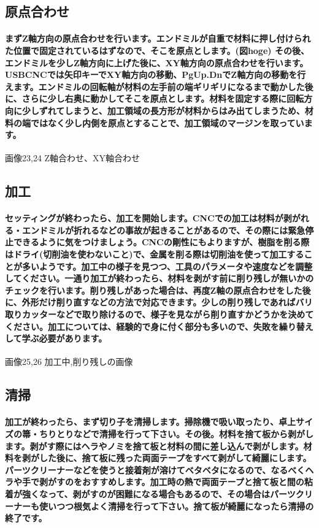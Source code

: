 \documentclass[b5paper, 9pt, twocolumn, titlepage,openany]{jsbook}%
\begin{document}
\subsection{原点合わせ}
\paragraph{まずZ軸方向の原点合わせを行います。エンドミルが自重で材料に押し付けられた位置で固定されているはずなので、そこを原点とします。(図hoge) その後、エンドミルを少しZ軸方向に上げた後に、XY軸方向の原点合わせを行います。USBCNCでは矢印キーでXY軸方向の移動、PgUp.DnでZ軸方向の移動を行えます。エンドミルの回転軸が材料の左手前の端ギリギリになるまで動かした後に、さらに少し右奥に動かしてそこを原点とします。材料を固定する際に回転方向に少しずれてしまうと、加工領域の長方形が材料からはみ出てしまうため、材料の端ではなく少し内側を原点とすることで、加工領域のマージンを取っています。}

画像23,24 Z軸合わせ、XY軸合わせ

\subsection{加工}
\paragraph{セッティングが終わったら、加工を開始します。CNCでの加工は材料が剥がれる・エンドミルが折れるなどの事故が起きることがあるので、その際には緊急停止できるように気をつけましょう。CNCの剛性にもよりますが、樹脂を削る際はドライ(切削油を使わないこと)で、金属を削る際は切削油を使って加工することが多いようです。加工中の様子を見つつ、工具のパラメータや速度などを調整してください。一通り加工が終わったら、材料を剥がす前に削り残しが無いかのチェックを行います。削り残しがあった場合は、再度Z軸の原点合わせをした後に、外形だけ削り直すなどの方法で対応できます。少しの削り残しであればバリ取りカッターなどで取り除けるので、様子を見ながら削り直すかどうかを決めてください。加工については、経験的で身に付く部分も多いので、失敗を繰り替えして学ぶ必要があります。}

画像25,26 加工中,削り残しの画像

\subsection{清掃}
\paragraph{加工が終わったら、まず切り子を清掃します。掃除機で吸い取ったり、卓上サイズの箒・ちりとりなどで清掃を行って下さい。その後。材料を捨て板から剥がします。剥がす際にはヘラやノミを捨て板と材料の間に差し込んで剥がします。材料を剥がした後に、捨て板に残った両面テープをすべて剥がして綺麗にします。パーツクリーナーなどを使うと接着剤が溶けてベタベタになるので、なるべくヘラや手で剥がすのをおすすめします。加工時の熱で両面テープと捨て板と間の粘着が強くなって、剥がすのが困難になる場合もあるので、その場合はパーツクリーナーも使いつつ根気よく清掃を行って下さい。捨て板が綺麗になったら清掃の終了です。}
\end{document}

